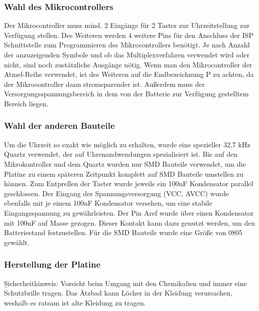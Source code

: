 \subsubsection{Wahl des Mikrocontrollers}
Der Mikrocontroller muss mind. 2 Eingänge für 2 Taster zur Uhrzeitstellung zur Verfügung stellen. Des Weiteren werden 4 weitere Pins für den Anschluss der ISP Schnittstelle zum Programmieren des Mikrocontrollers benötigt. Je nach Anzahl der anzuzeigenden Symbole und ob das Multiplexverfahren verwendet wird oder nicht,  sind noch zustätzliche Ausgänge nötig. Wenn man den Mikrocontroller der Atmel-Reihe verwendet, ist des Weiteren auf die Endbezeichnung {\quote P} zu achten, da der Mikrocontroller dann stromsparender ist. Außerdem muss der Versorgungsspannungsbereich in dem von der Batterie zur Verfügung gestelltem Bereich liegen.

\subsubsection{Wahl der anderen Bauteile}
Um die Uhrzeit so exakt wie möglich zu erhalten, wurde eine spezieller 32,7 kHz Quartz verwendet, der auf Uhrenandwendungen spezialisiert ist. Bis auf den Mikrokontroller und dem Quartz wurden nur SMD Bauteile verwendet, um die Platine zu einem späteren Zeitpunkt komplett auf SMD Bauteile umstellen zu können. Zum Entprellen der Taster wurde jeweils ein 100nF Kondensator parallel geschlossen. Der Eingang der Spannungsversorgung (VCC, AVCC) wurde ebenfalls mit je einem 100nF Kondensator versehen, um eine stabile Eingangsspannung zu gewährleisten. Der Pin Aref wurde über einen Kondensator mit 100nF auf Masse gezogen. Dieser Kontakt kann dazu genutzt werden, um den Batteriestand festzustellen. Für die SMD Bauteile wurde eine Größe von 0805 gewählt. 

\subsubsection{Herstellung der Platine}
{\b Sicherheithinweis:} Vorsicht beim Umgang mit den Chemikalien und immer eine Schutzbrille tragen. Das Ätzbad kann Löcher in der Kleidung verursachen, weshalb es ratsam ist alte Kleidung zu tragen.


